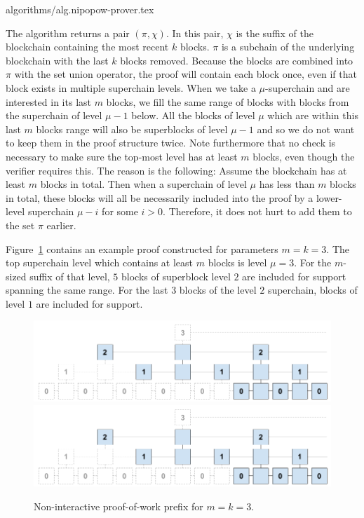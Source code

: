 {algorithms/alg.nipopow-prover.tex}

The algorithm returns a pair $(\pi, \chi)$. In this pair, $\chi$ is the
suffix of the blockchain containing the most recent $k$ blocks. $\pi$ is
a subchain of the underlying blockchain with the last $k$ blocks removed.
Because the blocks are combined into $\pi$ with the set union operator,
the proof will contain each block once, even if that block exists in multiple
superchain levels. When we take a $\mu$-superchain and are interested
in its last $m$ blocks, we fill the same range of blocks with blocks from the
superchain of level $\mu - 1$ below.  All the blocks of level $\mu$ which are
within this last $m$ blocks range will also be superblocks of level $\mu - 1$
and so we do not want to keep them in the proof structure twice.  Note
furthermore that no check is necessary to make sure the top-most level has at
least $m$ blocks, even though the verifier requires this. The reason is the
following: Assume the blockchain has at least $m$ blocks in total. Then when a
superchain of level $\mu$ has less than $m$ blocks in total, these blocks will
all be necessarily included into the proof by a lower-level superchain $\mu -
i$ for some $i > 0$.  Therefore, it does not hurt to add them to the set
$\pi$ earlier.


Figure~\ref{fig.nipopow} contains an example proof constructed for parameters
$m = k = 3$. The top superchain level which contains at least $m$ blocks is
level $\mu = 3$. For the $m$-sized suffix of that level, $5$ blocks of
superblock level $2$ are included for support spanning the same range. For the
last $3$ blocks of the level $2$ superchain, blocks of level $1$ are included
for support.

\begin{figure}[h]
    \caption{Non-interactive proof-of-work prefix for $m=k = 3$.}
    \centering
    \iftwocolumn
        \includegraphics[width=\columnwidth,keepaspectratio]{figures/non-interactive-popow.png}
    \else
        \includegraphics[width=0.7\columnwidth,keepaspectratio]{figures/non-interactive-popow.png}
    \fi
    \label{fig.nipopow}
\end{figure}

